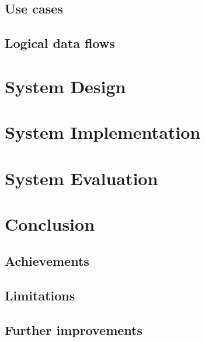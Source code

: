 \documentclass[12pt,a4paper]{report}
\theoremstyle{definition}
\begin{document}
\subsection{Use cases}


\subsection{Logical data flows}

\newpage
\section{System Design}

\newpage
\section{System Implementation}

\newpage


\section{System Evaluation}

\newpage
\section{Conclusion}
\subsection{Achievements}

\subsection{Limitations}
\subsection{Further improvements}

\newpage

\printbibliography

 
\end{document}
